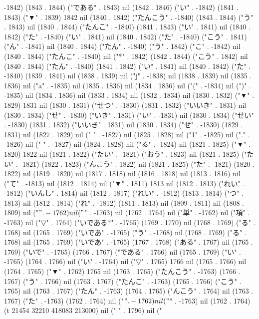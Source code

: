 -1842) (1843 . 1844) ("である" . 1843) nil (1842 . 1846) ("い" . -1842) (1841 . 1843) ("▼" . 1839) 1842 nil (1840 . 1842) ("たんこう" . -1840) (1843 . 1844) ("う" . 1843) nil (1840 . 1844) ("たんこ" . -1840) (1841 . 1843) ("い" . 1841) nil (1840 . 1842) ("た" . -1840) ("い" . 1841) nil (1840 . 1842) ("た" . -1840) ("こう" . 1841) ("ん" . -1841) nil (1840 . 1844) ("たん" . -1840) ("う" . 1842) ("こ" . -1842) nil (1840 . 1844) ("たんこ" . -1840) nil ("*" . 1842) (1842 . 1844) ("こう" . 1842) nil (1840 . 1844) ("たん" . -1840) (1841 . 1842) ("い" . 1841) nil (1840 . 1842) ("た" . -1840) (1839 . 1841) nil (1838 . 1839) nil ("j" . -1838) nil (1838 . 1839) nil (1835 . 1836) nil ("a" . -1835) nil (1835 . 1836) nil (1834 . 1836) nil ("(" . -1834) nil (")" . -1835) nil (1834 . 1836) nil (1833 . 1834) nil (1832 . 1834) nil (1830 . 1832) ("▼" . 1829) 1831 nil (1830 . 1831) ("せつ" . -1830) (1831 . 1832) ("いいき" . 1831) nil (1830 . 1834) ("せ" . -1830) ("いき" . 1831) ("い" . -1831) nil (1830 . 1834) ("せい" . -1830) (1831 . 1832) ("いいき" . 1831) nil (1830 . 1834) ("せ" . -1830) (1829 . 1831) nil (1827 . 1829) nil (" " . -1827) nil (1825 . 1828) nil ("1" . -1825) nil ("." . -1826) nil (" " . -1827) nil (1824 . 1828) nil ("る" . -1824) nil (1821 . 1825) ("▼" . 1820) 1822 nil (1821 . 1822) ("たい" . -1821) ("おう" . 1823) nil (1821 . 1825) ("たい" . -1821) (1822 . 1823) ("んこう" . 1822) nil (1821 . 1825) ("た" . -1821) (1820 . 1822) nil (1819 . 1820) nil (1817 . 1818) nil (1816 . 1818) nil (1813 . 1816) nil ("て" . -1813) nil (1812 . 1814) nil ("▼" . 1811) 1813 nil (1812 . 1813) ("れい" . -1812) ("いんし" . 1814) nil (1812 . 1817) ("れい" . -1812) (1813 . 1814) ("つ" . 1813) nil (1812 . 1814) ("れ" . -1812) (1811 . 1813) nil (1809 . 1811) nil (1808 . 1809) nil ("$" . -1762) nil ("$" . -1763) nil (1762 . 1764) nil ("単" . -1762) nil ("項" . -1763) nil ("▽" . 1764) ("いである*" . -1765) (1769 . 1770) nil (1768 . 1769) ("る" . 1768) nil (1765 . 1769) ("いであ" . -1765) ("う" . -1768) nil (1768 . 1769) ("る" . 1768) nil (1765 . 1769) ("いであ" . -1765) (1767 . 1768) ("ある" . 1767) nil (1765 . 1769) ("いで" . -1765) (1766 . 1767) ("である" . 1766) nil (1765 . 1769) ("い" . -1765) (1764 . 1766) nil ("い" . -1764) nil ("▽" . 1765) 1766 nil (1765 . 1766) nil (1764 . 1765) ("▼" . 1762) 1765 nil (1763 . 1765) ("たんこう" . -1763) (1766 . 1767) ("う" . 1766) nil (1763 . 1767) ("たんこ" . -1763) (1765 . 1766) ("こう" . 1765) nil (1763 . 1767) ("たん" . -1763) (1764 . 1765) ("んこう" . 1764) nil (1763 . 1767) ("た" . -1763) (1762 . 1764) nil ("$" . -1762) nil ("$" . -1763) nil (1762 . 1764) (t 21454 32210 418083 213000) nil (" " . 1796) nil ("
